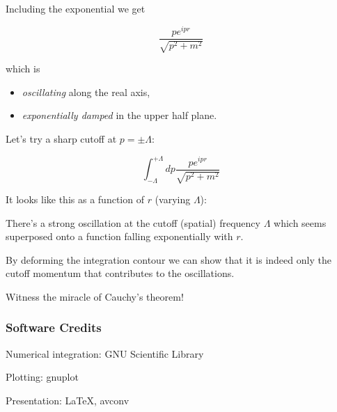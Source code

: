 \documentclass{beamer}
\newcommand{\integrand}{\frac{p e^{ipr}}{\sqrt{p^2 + m^2}}}
\begin{document}


\begin{frame}
Including the exponential we get

$$\integrand$$

which is

\begin{itemize}
\item \emph{oscillating} along the real axis,

\item \emph{exponentially damped} in the upper half plane.
\end{itemize}
\end{frame}



\begin{frame}
Let's try a sharp cutoff at $p = \pm \Lambda$:

$$\int_{-\Lambda}^{+\Lambda} dp \integrand$$

It looks like this as a function of $r$ (varying $\Lambda$):
\end{frame}



\begin{frame}
There's a strong oscillation at the cutoff (spatial) frequency $\Lambda$
which seems superposed onto a function falling exponentially with $r$.

By deforming the integration contour we can show that it is indeed only
the cutoff momentum that contributes to the oscillations.

Witness the miracle of Cauchy's theorem!
\end{frame}







\begin{frame}
\frametitle{Software Credits}

Numerical integration: GNU Scientific Library

Plotting: gnuplot

Presentation: \LaTeX, avconv
\end{frame}
\end{document}

